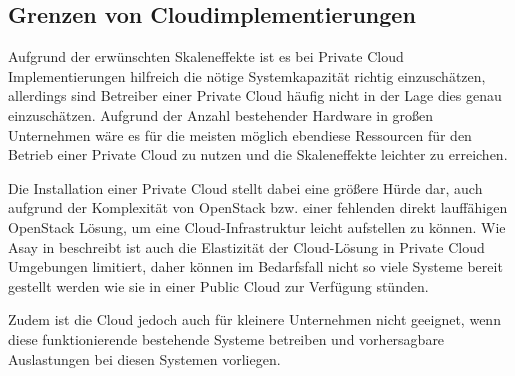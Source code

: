 \subsection{Grenzen von Cloudimplementierungen}
Aufgrund der erwünschten Skaleneffekte ist es bei Private Cloud Implementierungen hilfreich die nötige Systemkapazität richtig einzuschätzen, allerdings sind Betreiber einer Private Cloud häufig nicht in der Lage dies genau einzuschätzen. Aufgrund der Anzahl bestehender Hardware in großen Unternehmen wäre es für die meisten möglich ebendiese Ressourcen für den Betrieb einer Private Cloud zu nutzen und die Skaleneffekte leichter zu erreichen. \cite{privateFail}

Die Installation einer Private Cloud stellt dabei eine größere Hürde dar, auch aufgrund der Komplexität von OpenStack  bzw. einer fehlenden direkt lauffähigen OpenStack Lösung, um eine Cloud-Infrastruktur leicht aufstellen zu können. Wie Asay in \cite{privateFail} beschreibt ist auch die Elastizität der Cloud-Lösung in Private Cloud Umgebungen limitiert, daher können im Bedarfsfall nicht so viele Systeme bereit gestellt werden wie sie in einer Public Cloud zur Verfügung stünden.

Zudem ist die Cloud jedoch auch für kleinere Unternehmen nicht geeignet, wenn diese funktionierende bestehende Systeme betreiben und vorhersagbare Auslastungen bei diesen Systemen vorliegen. \cite{privateFail2}